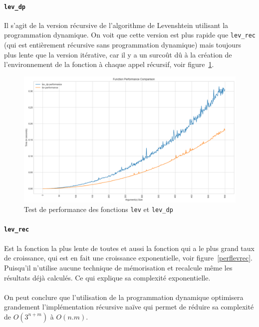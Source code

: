 \documentclass[12pt]{article}
\begin{document}
\paragraph{\texttt{lev\_dp}}
Il s'agit de la version récursive de l'algorithme de Levenshtein utilisant la programmation dynamique. On voit que cette version est plus rapide que \texttt{lev\_rec} (qui est entièrement récursive sans programmation dynamique) mais toujours plus lente que la version itérative, car il y a un surcoût dû à la création de l'environnement de la fonction à chaque appel récursif, voir figure~\ref{perflev}.

    \begin{figure}[!h]
        \centering
        \includegraphics[scale=0.4]{Images/Performance/Levenshtein/performance_levenshtein&dp.png}
        \caption{Test de performance des fonctions \texttt{lev} et \texttt{lev\_dp}}
        \label{perflev}
    \end{figure}

\paragraph{\texttt{lev\_rec}}
Est la fonction la plus lente de toutes et aussi la fonction qui a le plus grand taux de croissance, qui est en fait une croissance exponentielle, voir figure~\ref{perflevrec}. Puisqu'il n'utilise aucune technique de mémorisation et recalcule même les résultats déjà calculés. Ce qui explique sa complexité exponentielle.
\\\\
On peut conclure que l'utilisation de la programmation dynamique optimisera grandement l'implémentation récursive naïve qui permet de réduire sa complexité de $O(3^{n + m})$ à $O(n.m)$.
    
\end{document}
